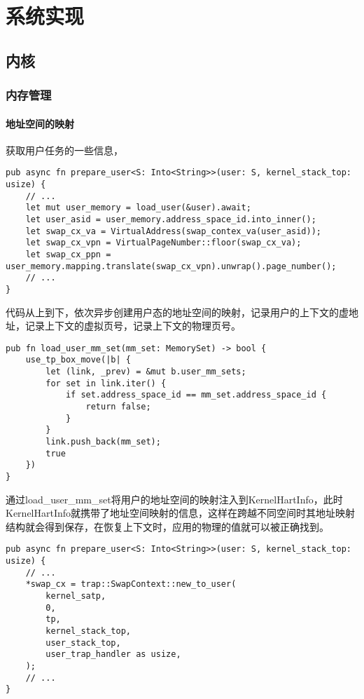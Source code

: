 \chapter{系统实现}
\label{chap:SystemImplement}

\section{内核}

\subsection{内存管理}

\subsubsection{地址空间的映射}

获取用户任务的一些信息， 
\begin{lstlisting}[caption=用户任务信息获取]
pub async fn prepare_user<S: Into<String>>(user: S, kernel_stack_top: usize) {
    // ...
    let mut user_memory = load_user(&user).await;
    let user_asid = user_memory.address_space_id.into_inner();
    let swap_cx_va = VirtualAddress(swap_contex_va(user_asid));
    let swap_cx_vpn = VirtualPageNumber::floor(swap_cx_va);
    let swap_cx_ppn = user_memory.mapping.translate(swap_cx_vpn).unwrap().page_number();
    // ...
}
\end{lstlisting}

代码从上到下，依次异步创建用户态的地址空间的映射，记录用户的上下文的虚地址，记录上下文的虚拟页号，记录上下文的物理页号。

\begin{lstlisting}[caption=向KernelHartInfo注入地址空间信息]
pub fn load_user_mm_set(mm_set: MemorySet) -> bool {
    use_tp_box_move(|b| {
        let (link, _prev) = &mut b.user_mm_sets;
        for set in link.iter() {
            if set.address_space_id == mm_set.address_space_id {
                return false;
            }
        }
        link.push_back(mm_set);
        true
    })
}
\end{lstlisting}
通过load\_user\_mm\_set将用户的地址空间的映射注入到KernelHartInfo，此时KernelHartInfo就携带了地址空间映射的信息，这样在跨越不同空间时其地址映射结构就会得到保存，在恢复上下文时，应用的物理的值就可以被正确找到。


\begin{lstlisting}[caption=将地址空间信息传递给用户]
pub async fn prepare_user<S: Into<String>>(user: S, kernel_stack_top: usize) {
    // ...
    *swap_cx = trap::SwapContext::new_to_user(
        kernel_satp,
        0,
        tp,
        kernel_stack_top,
        user_stack_top,
        user_trap_handler as usize,
    );
    // ...
}
    
\end{lstlisting}

